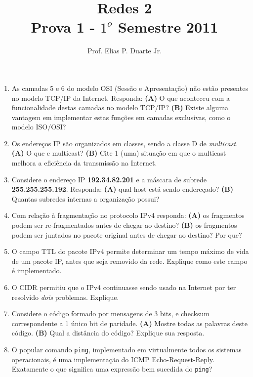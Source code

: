 \documentclass[a4paper,11pt]{article}
\date{ }
\begin{document}
\title{
Redes 2\\
Prova 1 - $1^o$ Semestre 2011
}

\author {
Prof. Elias P. Duarte Jr.
}

\maketitle

\begin{enumerate}

\item As camadas 5 e 6 do modelo OSI (Sessão e Apresentação) não estão presentes
no modelo TCP/IP da Internet. Responda: \textbf{(A)} O que aconteceu com a
funcionalidade destas camadas no modelo TCP/IP? \textbf{(B)} Existe alguma
vantagem em implementar estas funções em camadas exclusivas, como o modelo
ISO/OSI?

\item Os endereços IP são organizados em classes, sendo a classe D de
\textit{multicast}. \textbf{(A)} O que e multicast? \textbf{(B)} Cite 1 (uma)
situação em que o multicast melhora a eficiência da transmissão na Internet.

\item Considere o endereço IP \textbf{192.34.82.201} e a máscara de subrede
\textbf{255.255.255.192}. Responda: \textbf{(A)} qual host está sendo
endereçado?  \textbf{(B)} Quantas subredes internas a organização possui?

\item Com relação à fragmentação no protocolo IPv4 responda: \textbf{(A)} os
fragmentos podem ser re-fragmentados antes de chegar ao destino? \textbf{(B)} os
fragmentos podem ser juntados no pacote original antes de chegar ao destino? Por
que?

\item O campo TTL do pacote IPv4 permite determinar um tempo máximo de vida de
um pacote IP, antes que seja removido da rede. Explique como este campo é
implementado.

\item O CIDR permitiu que o IPv4 continuasse sendo usado na Internet por ter
resolvido \textit{dois} problemas. Explique.

\item Considere o código formado por mensagens de 3 bits, e checksum
correspondente a 1 único bit de paridade. \textbf{(A)} Mostre todas as
palavras deste código. \textbf{(B)} Qual a distância do código? Explique sua
resposta.

\item O popular comando \texttt{ping}, implementado em virtualmente todos os
sistemas operacionais, é uma implementação do ICMP Echo-Request-Reply.
Exatamente o que significa uma expressão bem sucedida do \texttt{ping}?

\end{enumerate}

\clearpage
\end{document}
